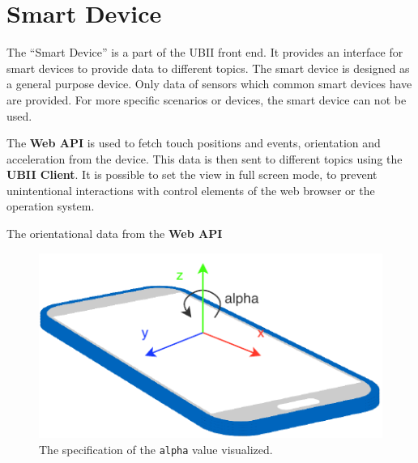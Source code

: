 \section{Smart Device}\label{section:smart-device}

The \enquote{Smart Device} is a part of the \ac{UBII} front end. It provides an interface for smart devices to provide data to different topics. The smart device is designed as a general purpose device. Only data of sensors which common smart devices have are provided. For more specific scenarios or devices, the smart device can not be used.

The \textbf{Web API} is used to fetch touch positions and events, orientation and acceleration from the device. This data is then sent to different topics using the \textbf{\ac{UBII} Client}. It is possible to set the view in full screen mode, to prevent unintentional interactions with control elements of the web browser or the operation system.



The orientational data from the \textbf{Web API} 

\begin{figure}[htpb]
  \centering
  \includegraphics[width=12cm]{figures/device_orientation_alpha.pdf}
  \caption[Device Orientation]{The specification of the \lstinline{alpha} value visualized.}\label{fig:ubii_front_end}
\end{figure}


